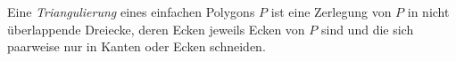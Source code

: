 \begin{definition}
    Eine \emph{Triangulierung} eines einfachen Polygons $P$ ist eine Zerlegung von $P$ in nicht überlappende Dreiecke, deren Ecken jeweils Ecken von $P$ sind und die sich paarweise nur in Kanten oder Ecken schneiden.
%
\end{definition}
